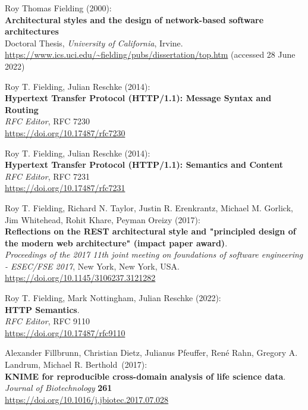 \begin{thebibliography}{9}
Roy Thomas Fielding (2000): \\
\textbf{Architectural styles and the design
of network-based software architectures}\\
Doctoral Thesis, 
\emph{University of California}, Irvine.\\
\url{https://www.ics.uci.edu/~fielding/pubs/dissertation/top.htm}
(accessed 28 June 2022) 


Roy T. Fielding, Julian Reschke (2014): \\
\textbf{Hypertext {Transfer
Protocol} ({HTTP}/1.1): {Message Syntax} and {Routing}}\\
\emph{RFC Editor}, RFC 7230 \\
\url{https://doi.org/10.17487/rfc7230}

Roy T. Fielding, Julian Reschke (2014): \\
\textbf{Hypertext {Transfer Protocol} ({HTTP}/1.1): {Semantics} and {Content}} \\
\emph{RFC Editor}, RFC 7231 \\
\url{https://doi.org/10.17487/rfc7231}

Roy T. Fielding, Richard N. Taylor, Justin R. Erenkrantz, Michael M.
Gorlick, Jim Whitehead, Rohit Khare, Peyman Oreizy (2017): \\
\textbf{Reflections on the {REST} architectural style and "principled
design of the modern web architecture" (impact paper award)}. \\
\emph{Proceedings of the 2017 11th joint meeting on foundations of software engineering - {ESEC}/{FSE} 2017}, New York, New York, USA.\\
\url{https://doi.org/10.1145/3106237.3121282}

Roy T. Fielding, Mark Nottingham, Julian Reschke (2022): \\
\textbf{HTTP Semantics}.\\
\emph{RFC Editor}, RFC 9110\\
\url{https://doi.org/10.17487/rfc9110}

Alexander Fillbrunn, Christian Dietz, Julianus Pfeuffer, René
Rahn, Gregory A. Landrum, Michael R. Berthold~(2017):\\
\textbf{KNIME for reproducible cross-domain analysis of life science
data}.\\
\emph{Journal of Biotechnology} \textbf{261}\\
\url{https://doi.org/10.1016/j.jbiotec.2017.07.028}


\end{thebibliography}
